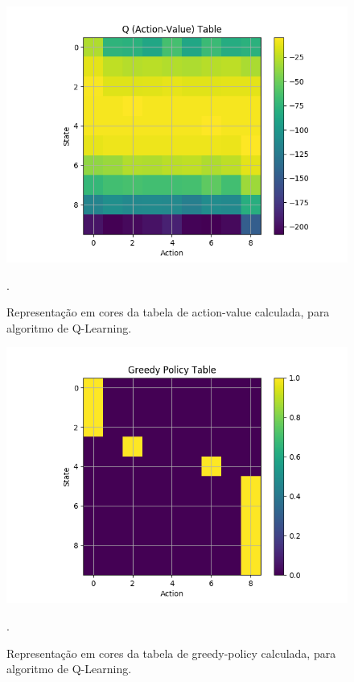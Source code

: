 \documentclass[conference]{IEEEtran}
\begin{document}
\begin{figure}[htbp]
\centering
\centerline{\includegraphics[scale=0.5]{imagens/q-learning/action_value_table.png}}
\caption{Representação em cores da tabela de action-value calculada, para algoritmo de Q-Learning.}.
\label{q-learning/action_value_table}
\end{figure}

\begin{figure}[htbp]
\centering
\centerline{\includegraphics[scale=0.5]{imagens/q-learning/greedy_policy_table.png}}
\caption{Representação em cores da tabela de greedy-policy calculada, para algoritmo de Q-Learning.}.
\label{q-learning/greedy_policy_table}
\end{figure}
\end{document}
